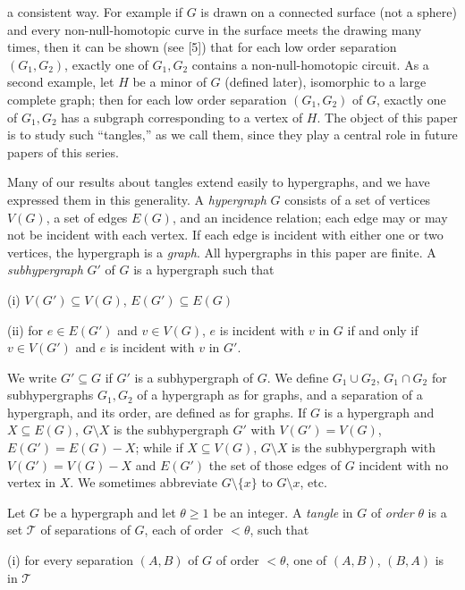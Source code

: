 \noindent a consistent way. For example if $G$ is drawn on a connected surface (not a sphere) and every non-null-homotopic curve in the surface meets the drawing many times, then it can be shown (see [5]) that for each low order separation $(G_1, G_2)$, exactly one of $G_1, G_2$ contains a non-null-homotopic circuit. As a second example, let $H$ be a minor of $G$ (defined later), isomorphic to a large complete graph; then for each low order separation $(G_1, G_2)$ of $G$, exactly one of $G_1, G_2$ has a subgraph corresponding to a vertex of $H$. The object of this paper is to study such ``tangles,'' as we call them, since they play a central role in future papers of this series.

Many of our results about tangles extend easily to hypergraphs, and we have expressed them in this generality. A \textit{hypergraph} $G$ consists of a set of vertices $V(G)$, a set of edges $E(G)$, and an incidence relation; each edge may or may not be incident with each vertex. If each edge is incident with either one or two vertices, the hypergraph is a \textit{graph}. All hypergraphs in this paper are finite. A \textit{subhypergraph} $G'$ of $G$ is a hypergraph such that

\hspace*{12pt}(i) $V(G') \subseteq V(G)$, $E(G') \subseteq E(G)$

\hspace*{12pt}(ii) for $e \in E(G')$ and $v \in V(G)$, $e$ is incident with $v$ in $G$ if and only if $v \in V(G')$ and $e$ is incident with $v$ in $G'$.

We write $G' \subseteq G$ if $G'$ is a subhypergraph of $G$. We define $G_1 \cup G_2$, $G_1 \cap G_2$ for subhypergraphs $G_1, G_2$ of a hypergraph as for graphs, and a separation of a hypergraph, and its order, are defined as for graphs. If $G$ is a hypergraph and $X \subseteq E(G)$, $G \setminus X$ is the subhypergraph $G'$ with $V(G') = V(G)$, $E(G') = E(G) - X$; while if $X \subseteq V(G)$, $G \setminus X$ is the subhypergraph with $V(G') = V(G) - X$ and $E(G')$ the set of those edges of $G$ incident with no vertex in $X$. We sometimes abbreviate $G \setminus \{x\}$ to $G \setminus x$, etc.

Let $G$ be a hypergraph and let $\theta \ge 1$ be an integer. A \textit{tangle} in $G$ of \textit{order} $\theta$ is a set $\mathscr{T}$ of separations of $G$, each of order $< \theta$, such that

\hspace*{12pt}(i) for every separation $(A, B)$ of $G$ of order $< \theta$, one of $(A, B)$, $(B, A)$ is in $\mathscr{T}$

